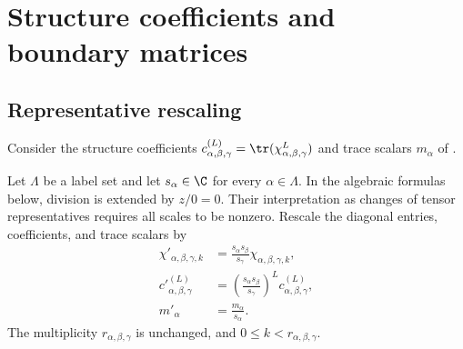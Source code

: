 \section{Structure coefficients and boundary matrices}
\label{sec:asymex_coefficients_boundaries}

\subsection{Representative rescaling}

Consider the structure coefficients
$c_{\alpha,\beta,\gamma}^{(L)}=\tr(\chi_{\alpha,\beta,\gamma}^{L})$
and trace scalars $m_\alpha$ of
\cite[Theorem~4.14(ii)]{Cirac2016MPDO_arXiv}.
\begin{definition}
    \label{def:asymex_rescaling}
    \leanok
    Let $\Lambda$ be a label set and let $s_\alpha\in\C$
    for every $\alpha\in\Lambda$. In the algebraic formulas below,
    division is extended by $z/0=0$. Their interpretation as changes
    of tensor representatives requires all scales to be nonzero.
    Rescale the diagonal entries, coefficients, and trace scalars by
    \begin{align}
        \chi'_{\alpha,\beta,\gamma,k}
                  & =\frac{s_\alpha s_\beta}{s_\gamma}
        \chi_{\alpha,\beta,\gamma,k},
        \label{eq:asymex_chi_rescale}                                 \\
        c'{}_{\alpha,\beta,\gamma}^{(L)}
                  & =\left(\frac{s_\alpha s_\beta}{s_\gamma}\right)^L
        c_{\alpha,\beta,\gamma}^{(L)},
        \label{eq:asymex_c_rescale}                                   \\
        m'_\alpha & =\frac{m_\alpha}{s_\alpha}.
        \label{eq:asymex_m_rescale}
    \end{align}
    The multiplicity $r_{\alpha,\beta,\gamma}$ is unchanged, and
    $0\leq k<r_{\alpha,\beta,\gamma}$.
\end{definition}

